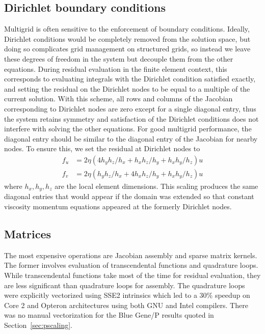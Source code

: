 \documentclass[3p]{elsarticle}
\begin{document}
\subsection{Dirichlet boundary conditions}\label{ssec:dirichlet}
Multigrid is often sensitive to the enforcement of boundary conditions.  Ideally, Dirichlet
conditions would be completely removed from the solution space, but doing so complicates grid
management on structured grids, so instead we leave these degrees of freedom in the system but
decouple them from the other equations.  During residual evaluation in the finite element context,
this corresponds to evaluating integrals with the Dirichlet condition satisfied exactly, and setting
the residual on the Dirichlet nodes to be equal to a multiple of the current solution.  With this
scheme, all rows and columns of the Jacobian corresponding to Dirichlet nodes are zero except for a
single diagonal entry, thus the system retains symmetry and satisfaction of the Dirichlet conditions
does not interfere with solving the other equations.  For good multigrid performance, the diagonal
entry should be similar to the diagonal entry of the Jacobian for nearby nodes.  To ensure this, we
set the residual at Dirichlet nodes to
\begin{align}\label{eq:dirichlet-scale}
  f_u &= 2 \eta (4 h_yh_z/h_x + h_x h_z/h_y + h_x h_y/h_z) u \\
  f_v &= 2 \eta (h_yh_z/h_x + 4 h_x h_z/h_y + h_x h_y/h_z) u
\end{align}
where $h_x,h_y,h_z$ are the local element dimensions.  This scaling produces the same diagonal
entries that would appear if the domain was extended so that constant viscosity momentum equations
appeared at the formerly Dirichlet nodes.

\subsection{Matrices}
The most expensive operations are Jacobian assembly and sparse matrix kernels.  The former involves evaluation of transcendental functions and quadrature loops.  While transcendental functions take most of the time for residual evaluation, they are less significant than quadrature loops for assembly.  The quadrature loops were explicitly vectorized using SSE2 intrinsics which led to a 30\% speedup on Core 2 and Opteron architectures using both GNU and Intel compilers.  There was no manual vectorization for the Blue Gene/P results quoted in Section~\ref{sec:pscaling}.
\end{document}
